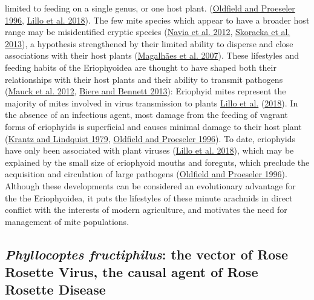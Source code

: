 \documentclass[12pt,final,CPage]{ufthesis}
\begin{document}
{limited to feeding on a single genus, or one host plant. (\protect\hyperlink{ref-Oldfield1996a}{Oldfield and Proeseler 1996}, \protect\hyperlink{ref-Lillo2018}{Lillo et al. 2018}). The few mite species which appear to have a broader host range may be misidentified cryptic species (\protect\hyperlink{ref-Navia2012}{Navia et al. 2012}, \protect\hyperlink{ref-Skoracka2013}{Skoracka et al. 2013}), a hypothesis strengthened by their limited ability to disperse and close associations with their host plants (\protect\hyperlink{ref-Magalhaes2007}{Magalhães et al. 2007}). These lifestyles and feeding habits of the Eriophyoidea are thought to have shaped both their relationships with their host plants and their ability to transmit pathogens (\protect\hyperlink{ref-Mauck2012}{Mauck et al. 2012}, \protect\hyperlink{ref-Biere2013}{Biere and Bennett 2013}): Eriophyid mites represent the majority of mites involved in virus transmission to plants \protect\hyperlink{ref-Lillo2018}{Lillo et al.} (\protect\hyperlink{ref-Lillo2018}{2018}). In the absence of an infectious agent, most damage from the feeding of vagrant forms of eriophyids is superficial and causes minimal damage to their host plant (\protect\hyperlink{ref-Krantz1979}{Krantz and Lindquist 1979}, \protect\hyperlink{ref-Oldfield1996a}{Oldfield and Proeseler 1996}). To date, eriophyids have only been associated with plant viruses (\protect\hyperlink{ref-Lillo2018}{Lillo et al. 2018}), which may be explained by the small size of eriophyoid mouths and foreguts, which preclude the acquisition and circulation of large pathogens (\protect\hyperlink{ref-Oldfield1996a}{Oldfield and Proeseler 1996}). Although these developments can be considered an evolutionary advantage for the the Eriophyoidea, it puts the lifestyles of these minute arachnids in direct conflict with the interests of modern agriculture, and motivates the need for management of mite populations.

  \hypertarget{litrev-pfruct}{%
  \subsection{\texorpdfstring{\emph{Phyllocoptes fructiphilus}: the vector of Rose Rosette Virus, the causal agent of Rose Rosette Disease}{Phyllocoptes fructiphilus: the vector of Rose Rosette Virus, the causal agent of Rose Rosette Disease}}\label{litrev-pfruct}}

}
\end{document}
